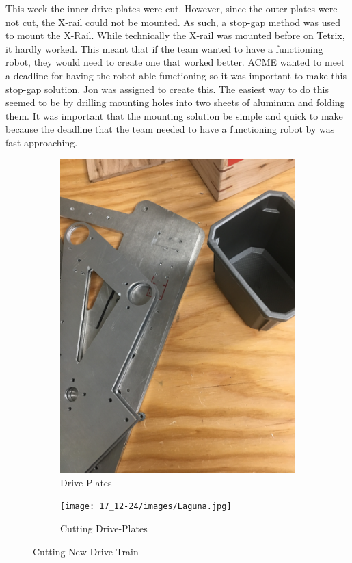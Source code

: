 \documentclass{article}
\begin{document}
This week the inner drive plates were cut. However, since the outer plates were not cut, the X-rail could not be mounted. As such, a stop-gap method was used to mount the X-Rail. While technically the X-rail was mounted before on Tetrix, it hardly worked. This meant that if the team wanted to have a functioning robot, they would need to create one that worked better. ACME wanted to meet a deadline for having the robot able functioning so it was important to make this stop-gap solution. Jon was assigned to create this. The easiest way to do this seemed to be by drilling mounting holes into two sheets of aluminum and folding them. It was important that the mounting solution be simple and quick to make because the deadline that the team needed to have a functioning robot by was fast approaching. 

\begin{figure}[h!]
\centering
\begin{subfigure}{.5\textwidth}
  \centering
  \includegraphics[width=\textwidth,angle=-90]{17_12-24/images/DrivePlates.JPG}
  \caption{Drive-Plates}
  \label{fig:Plates}
 \end{subfigure}
\begin{subfigure}{.45\textwidth}
  \centering
  \texttt{[image: 17\_12-24/images/Laguna.jpg]}
  \caption{Cutting Drive-Plates}
  \label{fig:Cutting}
  \end{subfigure}
  \caption{Cutting New Drive-Train}
  \end{figure}
\end{document}
